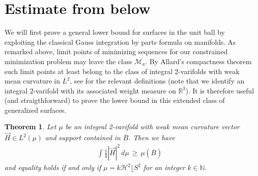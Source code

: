 \documentclass[reqno,makeidx,12pt]{amsart}
\theoremstyle{note}
\newtheorem{theorem}{Theorem}
\theoremstyle{definition}
\begin{document}
\section{Estimate from below}
We will first prove a general lower bound for surfaces in the unit ball by exploiting the classical Gauss integration by parts formula on manifolds. As remarked above, limit points of minimizing sequences for our constrained minimization problem may leave the class ${\mathcal{M}}_a$. By Allard's compactness theorem \cite{Alla72} such limit points at least belong to the class of integral 2-varifolds with weak mean curvature in $L^2$, see \cite{Simo83} for the relevant definitions (note that we identify an integral 2-varifold with its associated weight measure on ${\mathbb R}^3$). It is therefore useful (and straigthforward) to prove the lower bound in this extended class of generalized surfaces.
\begin{theorem}\label{thm:est-below}
Let $\mu$ be an integral 2-varifold with weak mean curvature vector $\vec{H}\in
L^2(\mu)$ and support contained in $\overline{B}$. Then we have
\begin{gather}\label{eq:est-below}
  \int \frac{1}{4}|\vec{H}|^2\,d\mu \,\geq\, \mu(\overline{B})
\end{gather}
and equality holds if and only if $\mu=k{\ensuremath{\mathcal{H}}}^2\lfloor S^2$ for an integer
$k\in{\ensuremath{\mathbb{N}}}$. 
\end{theorem}
\end{document}
